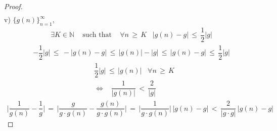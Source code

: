 \begin{theorem}
\begin{proof}
\begin{align*}
    \end{align*}
    v)  $\{g(n)\}_{n = 1}^{\infty},$ 
    \begin{align*}
        \exists K \in \mathbb{N} \hspace{10pt} \text{ such that } \hspace{10pt} \forall n \hspace{2pt} \geq \hspace{2pt} K \hspace{10pt} \lvert g(n) - g \rvert \hspace{2pt} \leq \hspace{2pt} \dfrac{1}{2} \lvert g \rvert
    \end{align*}
    \begin{align*}
        -\dfrac{1}{2} \lvert g \rvert \hspace{2pt} \leq \hspace{2pt} -\lvert g(n) - g \rvert \hspace{2pt} \leq \hspace{2pt} \lvert g(n) \rvert - \lvert g \rvert \hspace{2pt} \leq \hspace{2pt} \lvert g(n) - g \rvert \hspace{2pt} \leq \hspace{2pt} \dfrac{1}{2} \lvert g \rvert 
    \end{align*}
    \begin{align*}
        &\dfrac{1}{2} \lvert g \rvert \hspace{2pt} \leq \hspace{2pt} \lvert g(n) \rvert \hspace{10pt} \forall n \hspace{2pt} \geq \hspace{2pt} K \\[1ex]
        &\Longleftrightarrow \hspace{10pt} \dfrac{1}{\lvert g(n) \rvert} \hspace{2pt} < \hspace{2pt} \dfrac{2}{\lvert g \rvert}
    \end{align*}
    \begin{align*}
        \Big\lvert \dfrac{1}{g(n)} - \dfrac{1}{g} \Big\rvert \hspace{2pt} = \hspace{2pt} \Big\lvert \dfrac{g}{g \cdot g(n)} - \dfrac{g(n)}{g \cdot g(n)} \Big\rvert \hspace{2pt} = \hspace{2pt} \Big\lvert \dfrac{1}{g \cdot g(n)} \Big\rvert \hspace{2pt} \lvert g(n) - g \rvert \hspace{2pt} < \hspace{2pt} \dfrac{2}{\lvert g \cdot g \rvert} \hspace{2pt} \lvert g(n) - g \rvert

\end{align*}
\end{proof}
\end{theorem}
